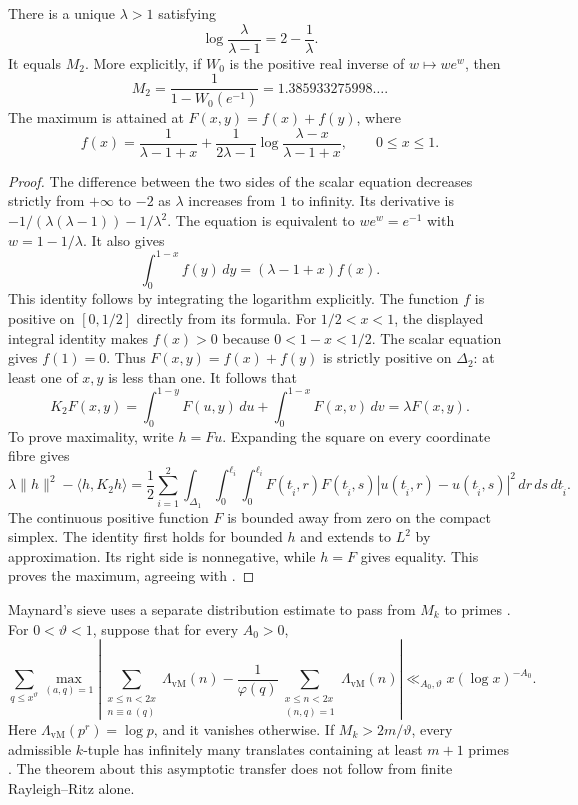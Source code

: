 \begin{theorem}
\label{syn-arith:M2}
There is a unique $\lambda>1$ satisfying
\[
 \log\frac\lambda{\lambda-1}=2-\frac1\lambda.
\]
It equals $M_2$.  More explicitly, if $W_0$ is the positive real inverse of
$w\mapsto we^w$, then
\[
 M_2=\frac1{1-W_0(e^{-1})}=1.385933275998\ldots.
\]
The maximum is attained at $F(x,y)=f(x)+f(y)$, where
\[
 f(x)=\frac1{\lambda-1+x}
       +\frac1{2\lambda-1}\log\frac{\lambda-x}{\lambda-1+x},
       \qquad 0\leq x\leq1.
\]
\end{theorem}
\begin{proof}
The difference between the two sides of the scalar equation decreases
strictly from $+\infty$ to $-2$ as $\lambda$ increases from $1$ to infinity.
Its derivative is $-1/(\lambda(\lambda-1))-1/\lambda^2$.
The equation is equivalent to $we^w=e^{-1}$ with $w=1-1/\lambda$.
It also gives
\[
 \int_0^{1-x}f(y)\,dy=(\lambda-1+x)f(x).
\]
This identity follows by integrating the logarithm explicitly.
The function $f$ is positive on $[0,1/2]$ directly from its formula.
For $1/2<x<1$, the displayed integral identity makes $f(x)>0$ because $0<1-x<1/2$. The scalar equation gives $f(1)=0$. Thus $F(x,y)=f(x)+f(y)$ is strictly positive on $\Delta_2$: at least one of $x,y$ is less than one.
It follows that
\[
 K_2F(x,y)=\int_0^{1-y}F(u,y)\,du+
          \int_0^{1-x}F(x,v)\,dv=\lambda F(x,y).
\]
To prove maximality, write $h=Fu$.  Expanding the square on every coordinate fibre gives
\[
 \lambda\|h\|^2-\langle h,K_2h\rangle
 =\frac12\sum_{i=1}^2\int_{\Delta_1}
   \int_0^{\ell_i}\int_0^{\ell_i}
   F(t_{\widehat i},r)F(t_{\widehat i},s)
   |u(t_{\widehat i},r)-u(t_{\widehat i},s)|^2\,dr\,ds\,dt_{\widehat i}.
\]
The continuous positive function $F$ is bounded away from zero on the compact simplex.
The identity first holds for bounded $h$ and extends to $L^2$ by approximation.
Its right side is nonnegative, while $h=F$ gives equality.
This proves the maximum, agreeing with
\cite[Corollaries~6.2--6.3]{syn-arith:Polymath}.
\end{proof}

Maynard's sieve uses a separate distribution estimate to pass from $M_k$ to primes
\cite[Proposition~4.2]{syn-arith:Maynard}.
For $0<\vartheta<1$, suppose that for every $A_0>0$,
\[
 \sum_{q\leq x^\vartheta}\max_{(a,q)=1}
 \left|\sum_{\substack{x\leq n<2x\\n\equiv a\ (q)}}\Lambda_{\mathrm{vM}}(n)
 -\frac1{\varphi(q)}\sum_{\substack{x\leq n<2x\\(n,q)=1}}
            \Lambda_{\mathrm{vM}}(n)\right|
 \ll_{A_0,\vartheta}x(\log x)^{-A_0}.
\]
Here $\Lambda_{\mathrm{vM}}(p^r)=\log p$, and it vanishes otherwise.
If $M_k>2m/\vartheta$, every admissible $k$-tuple has infinitely many translates
containing at least $m+1$ primes
\cite[Theorem~3.8]{syn-arith:Polymath}.
The theorem about this asymptotic transfer does not follow from finite Rayleigh--Ritz alone.

